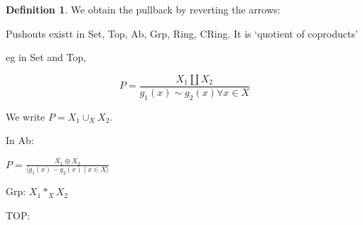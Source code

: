 \documentclass{article}
\theoremstyle{definition}
\newtheorem*{definition}{Definition}
\begin{document}
    \begin{definition}
        We obtain the pullback by reverting the arrows:

        \begin{center}
        \end{center}
    \end{definition}

    Pushouts existt in Set, Top, Ab, Grp, Ring, CRing. It is `quotient of coproducts'

    eg in Set and Top,

    \begin{center}
    \end{center}

    \[
        P = \frac{X_1 \coprod X_2}{g_1(x) \sim g_2(x) \forall x\in X}
    \]

    We write \(P = X_1 \cup_X X_2\).
    
    In Ab:

    \(P = \frac{X_1 \oplus X_2}{\langle g_1(x) - g_2(x) \mid x\in X \rangle}\)

    Grp: \(X_1 \ast_X X_2\)
    
    TOP:

    \begin{center}
    \end{center}

    \begin{center}
    \end{center}

    \begin{center}
    \end{center}
\end{document}
